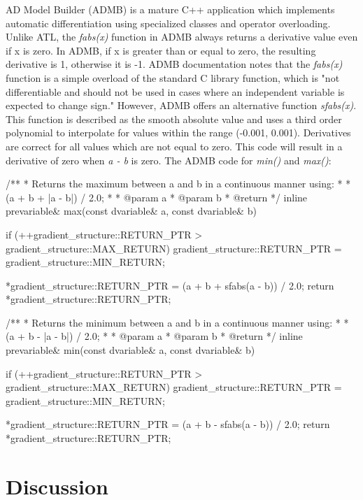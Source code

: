 \documentclass[oneside]{article}
\begin{document}
AD Model Builder (ADMB) is a mature C++ application which implements automatic differentiation using specialized classes and operator overloading. \cite{ admb} Unlike ATL, the \textit{fabs(x)} function in ADMB always returns a derivative value even if x is zero. In ADMB, if x is greater than or equal to zero, the resulting derivative is 1, otherwise it is -1. ADMB documentation notes that the \textit{fabs(x)} function is a simple overload of the standard C library function, which is "not differentiable and should not be used in cases where an independent variable is expected to change sign." However, ADMB offers an alternative function \textit{sfabs(x)}. This function is described as the smooth absolute value and uses a third order polynomial to interpolate for values within the range (-0.001, 0.001). Derivatives are correct for all values which are not equal to zero. This code will result in a derivative of zero when \textit{a - b} is zero. The ADMB code for \textit{min()} and \textit{max()}:

\begin{cppsource}

/**
 * Returns the maximum between a and b in a continuous manner using:
 *
 * (a + b + |a - b|) / 2.0;
 *
 * @param a
 * @param b
 * @return
 */
inline prevariable& max(const dvariable& a, const dvariable& b) {
    if (++gradient_structure::RETURN_PTR > gradient_structure::MAX_RETURN)
        gradient_structure::RETURN_PTR = gradient_structure::MIN_RETURN;

    *gradient_structure::RETURN_PTR = (a + b + sfabs(a - b)) / 2.0;
    return *gradient_structure::RETURN_PTR;
}


/**
 * Returns the minimum between a and b in a continuous manner using:
 *
 * (a + b - |a - b|) / 2.0;
 *
 * @param a
 * @param b
 * @return
 */
inline prevariable& min(const dvariable& a, const dvariable& b) {
    if (++gradient_structure::RETURN_PTR > gradient_structure::MAX_RETURN)
        gradient_structure::RETURN_PTR = gradient_structure::MIN_RETURN;

    *gradient_structure::RETURN_PTR = (a + b - sfabs(a - b)) / 2.0;
    return *gradient_structure::RETURN_PTR;
}

\end{cppsource}




\section{Discussion}
\end{document}
